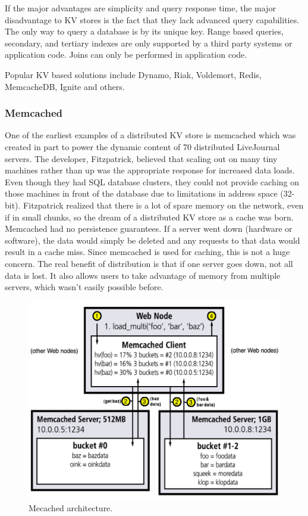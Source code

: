 \documentclass[]{article}
\begin{document}
If the major advantages are simplicity and query response time\cite{chen_big_2014}, the major disadvantage to KV stores is the fact that they lack advanced query capabilities. The only way to query a database is by its unique key. Range based queries, secondary, and tertiary indexes are only supported by a third party systems or application code. Joins can only be performed in application code\cite{design-voldemort}.

Popular KV based solutions include Dynamo, Riak, Voldemort, Redis, MemcacheDB, Ignite and others.

\subsubsection{Memcached}
One of the earliest examples of a distributed KV store is memcached\cite{fitzpatrick_distributed_2004} which was created in part to power the dynamic content of 70 distributed LiveJournal servers. The developer, Fitzpatrick, believed that scaling out on many tiny machines rather than up was the appropriate response for increased data loads. Even though they had SQL database clusters, they could not provide caching on those machines in front of the database due to limitations in address space (32-bit). Fitzpatrick realized that there is a lot of spare memory on the network, even if in small chunks, so the dream of a distributed KV store as a cache was born. Memcached had no persistence guarantees. If a server went down (hardware or software), the data would simply be deleted and any requests to that data would result in a cache miss. Since memcached is used for caching, this is not a huge concern. The real benefit of distribution is that if one server goes down, not all data is lost. It also allows users to take advantage of memory from multiple servers, which wasn't easily possible before.

\begin{figure}
    \centering
    \includegraphics[width=1.0\linewidth]{img/memcached}
    \caption[Mecached architecture.]{Mecached architecture. \cite{fitzpatrick_distributed_2004}}
    \label{fig:memcached}
\end{figure}
\end{document}

